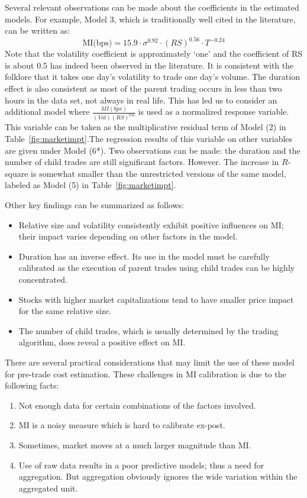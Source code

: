Several relevant observations can be made about the coefficients in the estimated models. For example, Model 3, which is traditionally well cited in the literature, can be written as:
	\[
	\text{MI(bps)}= 15.9\cdot\sigma^{0.92}\cdot(RS)^{0.56}\cdot T^{-0.24}
	\]
Note that the volatility coefficient is approximately `one' and the coefficient of RS is about 0.5 has indeed been observed in the literature. It is consistent with the folklore that it takes one day's volatility to trade one day's volume. The duration effect is also consistent as most of the parent trading occurs in less than two hours in the data set, not always in real life. This has led us to consider an additional model where $\frac{MI(bps)}{(Vol)(RS)^{0.6}}$ is used as a normalized response variable. This variable can be taken as the multiplicative residual term of  Model (2) in Table~\ref{fig:marketimpt}.The regression results of this variable on other variables are given under Model (6*). Two observations can be made: the duration and the number of child trades are still significant factors. However. The increase in $R$-square is somewhat smaller than the unrestricted versions of the same model, labeled as Model (5) in Table~\ref{fig:marketimpt}.


Other key findings can be summarized as follows:

\begin{itemize}
\item Relative size and volatility consistently exhibit positive influences on MI; their impact varies depending on other factors in the model.

\item Duration has an inverse effect. Its use in the model must be carefully calibrated as the execution of parent trades using child trades can be highly concentrated.

\item Stocks with higher market capitalizations tend to have smaller price impact for the same relative size.

\item The number of child trades, which is usually determined by the trading algorithm, does reveal a positive effect on MI.
\end{itemize}

There are several practical considerations that may limit the use of these model for pre-trade cost estimation. These challenges in MI calibration is due to the following facts:
	\begin{enumerate}[--]
	\item Not enough data for certain combinations of the factors involved.
	
	\item MI is a noisy measure which is hard to calibrate ex-post.
	
	\item Sometimes, market moves at a much larger magnitude than MI.
	
	\item Use of raw data results in a poor predictive models; thus a need for aggregation. But aggregation obviously ignores the wide variation within the aggregated unit. 
	\end{enumerate}
